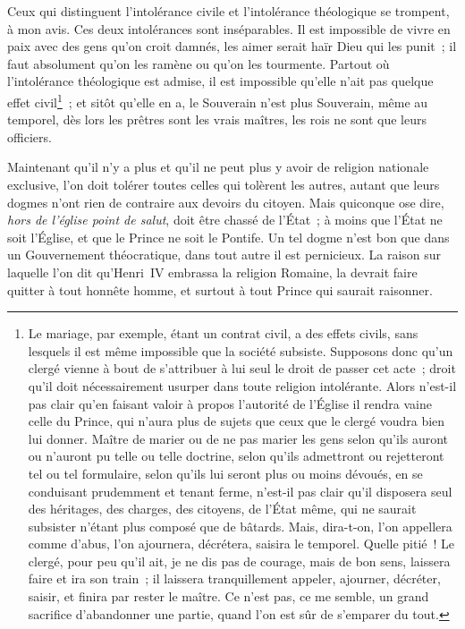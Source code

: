 \documentclass[french,twoside]{book} %
\begin{document}
Ceux qui distinguent l’intolérance civile et l’intolérance théologique se trompent, à mon avis. Ces deux intolérances sont inséparables. Il est impossible de vivre en paix avec des gens qu’on croit damnés, les aimer serait haïr Dieu qui les punit ; il faut absolument qu’on les ramène ou qu’on les tourmente. Partout où l’intolérance théologique est admise, il est impossible qu’elle n’ait pas quelque effet civil\footnote{Le mariage, par exemple, étant un contrat civil, a des effets civils, sans lesquels il est même impossible que la société subsiste. Supposons donc qu’un clergé vienne à bout de s’attribuer à lui seul le droit de passer cet acte ; droit qu’il doit nécessairement usurper dans toute religion intolérante. Alors n’est-il pas clair qu’en faisant valoir à propos l’autorité de l’Église il rendra vaine celle du Prince, qui n’aura plus de sujets que ceux que le clergé voudra bien lui donner. Maître de marier ou de ne pas marier les gens selon qu’ils auront ou n’auront pu telle ou telle doctrine, selon qu’ils admettront ou rejetteront tel ou tel formulaire, selon qu’ils lui seront plus ou moins dévoués, en se conduisant prudemment et tenant ferme, n’est-il pas clair qu’il disposera seul des héritages, des charges, des citoyens, de l’État même, qui ne saurait subsister n’étant plus composé que de bâtards. Mais, dira-t-on, l’on appellera comme d’abus, l’on ajournera, décrétera, saisira le temporel. Quelle pitié ! Le clergé, pour peu qu’il ait, je ne dis pas de courage, mais de bon sens, laissera faire et ira son train ; il laissera tranquillement appeler, ajourner, décréter, saisir, et finira par rester le maître. Ce n’est pas, ce me semble, un grand sacrifice d’abandonner une partie, quand l’on est sûr de s’emparer du tout.} ; et sitôt qu’elle en a, le Souverain n’est plus Souverain, même au temporel, dès lors les prêtres sont les vrais maîtres, les rois ne sont que leurs officiers.\par
Maintenant qu’il n’y a plus et qu’il ne peut plus y avoir de religion nationale exclusive, l’on doit tolérer toutes celles qui tolèrent les autres, autant que leurs dogmes n’ont rien de contraire aux devoirs du citoyen. Mais quiconque ose dire, {\itshape hors de l’église point de salut}, doit être chassé de l’État ; à moins que l’État ne soit l’Église, et que le Prince ne soit le Pontife. Un tel dogme n’est bon que dans un Gouvernement théocratique, dans tout autre il est pernicieux. La raison sur laquelle l’on dit qu’Henri IV embrassa la religion Romaine, la devrait faire quitter à tout honnête homme, et surtout à tout Prince qui saurait raisonner.
\end{document}
